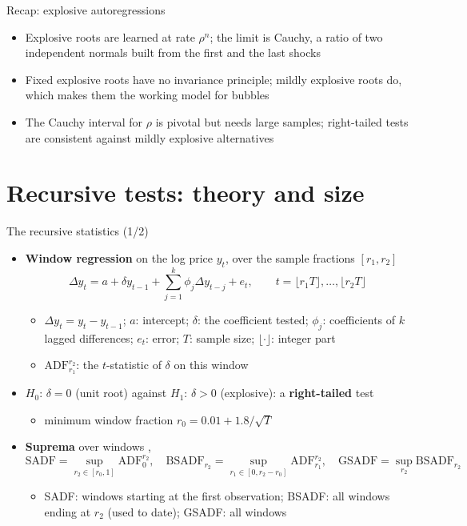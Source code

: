 \begin{frame}{Recap: explosive autoregressions}
\itemsize{\small}
\begin{itemize}
    \item Explosive roots are learned at rate $\rho^n$; the limit is Cauchy, a ratio of two independent normals built from the first and the last shocks
    \item Fixed explosive roots have no invariance principle; mildly explosive roots do, which makes them the working model for bubbles
    \item The Cauchy interval for $\rho$ is pivotal but needs large samples; right-tailed tests are consistent against mildly explosive alternatives
\end{itemize}
\end{frame}


\section{Recursive tests: theory and size}

\begin{frame}{The recursive statistics (1/2)}
\itemsize{\small}
\begin{itemize}
    \item \textbf{Window regression} on the log price $y_t$, over the sample fractions $[r_1, r_2]$ \[ \Delta y_t = a + \delta y_{t-1} + \sum_{j=1}^{k}\phi_j\Delta y_{t-j} + e_t, \qquad t = \lfloor r_1T\rfloor, \dots, \lfloor r_2T\rfloor \]
    \begin{itemize}
        \item $\Delta y_t = y_t - y_{t-1}$; $a$: intercept; $\delta$: the coefficient tested; $\phi_j$: coefficients of $k$ lagged differences; $e_t$: error; $T$: sample size; $\lfloor\cdot\rfloor$: integer part
        \item $\mathrm{ADF}_{r_1}^{r_2}$: the $t$-statistic of $\delta$ on this window
    \end{itemize}
    \item $H_0$: $\delta = 0$ (unit root) against $H_1$: $\delta > 0$ (explosive): a \textbf{right-tailed} test
    \begin{itemize}
        \item minimum window fraction $r_0 = 0.01 + 1.8/\sqrt T$
    \end{itemize}
    \item \textbf{Suprema} over windows ,  \[ \mathrm{SADF} = \sup_{r_2 \in [r_0, 1]}\mathrm{ADF}_0^{r_2}, \quad \mathrm{BSADF}_{r_2} = \sup_{r_1 \in [0, r_2 - r_0]}\mathrm{ADF}_{r_1}^{r_2}, \quad \mathrm{GSADF} = \sup_{r_2}\mathrm{BSADF}_{r_2} \]
    \begin{itemize}
        \item SADF: windows starting at the first observation; BSADF: all windows ending at $r_2$ (used to date); GSADF: all windows
    \end{itemize}
\end{itemize}
\end{frame}

